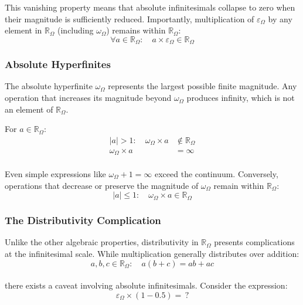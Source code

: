 \documentclass{article}
\begin{document}
This vanishing property means that absolute infinitesimals collapse to zero when their magnitude is sufficiently reduced. Importantly, multiplication of $\varepsilon_\Omega$ by any element in $\mathbb{R}_\Omega$ (including $\omega_\Omega$) remains within $\mathbb{R}_\Omega$:
$$\forall a \in \mathbb{R}_\Omega: \quad a \times \varepsilon_\Omega \in \mathbb{R}_\Omega$$

\subsubsection{Absolute Hyperfinites}

The absolute hyperfinite $\omega_\Omega$ represents the largest possible finite magnitude. Any operation that increases its magnitude beyond $\omega_\Omega$ produces infinity, which is not an element of $\mathbb{R}_\Omega$.

For $a \in \mathbb{R}_\Omega$:
\begin{align*}
|a| > 1: \quad \omega_\Omega \times a &\notin \mathbb{R}_\Omega \\
\omega_\Omega \times a &= \infty
\end{align*}\\Even simple expressions like $\omega_\Omega + 1 = \infty$ exceed the continuum. Conversely, operations that decrease or preserve the magnitude of $\omega_\Omega$ remain within $\mathbb{R}_\Omega$:
$$|a| \leq 1: \quad \omega_\Omega \times a \in \mathbb{R}_\Omega$$

\subsubsection{The Distributivity Complication}

Unlike the other algebraic properties, distributivity in $\mathbb{R}_\Omega$ presents complications at the infinitesimal scale. While multiplication generally distributes over addition:
$$a, b, c \in \mathbb{R}_\Omega: \quad a(b + c) = ab + ac$$\\there exists a caveat involving absolute infinitesimals. Consider the expression:
$$\varepsilon_\Omega \times (1 - 0.5) = \, ?$$
\end{document}
